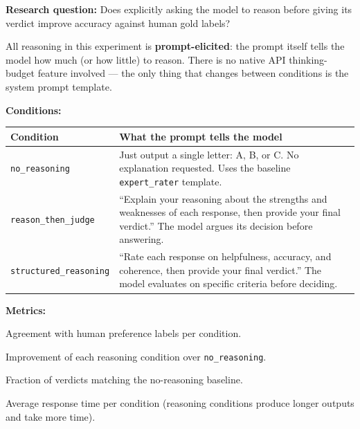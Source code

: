 \documentclass[11pt,a4paper]{article}
\begin{document}
\begin{experimentbox}
\textbf{Research question:} Does explicitly asking the model to reason before
giving its verdict improve accuracy against human gold labels?

\medskip
All reasoning in this experiment is \textbf{prompt-elicited}: the prompt
itself tells the model how much (or how little) to reason. There is no
native API thinking-budget feature involved --- the only thing that changes
between conditions is the system prompt template.

\medskip
\textbf{Conditions:}

\begin{center}
\small
\begin{tabular}{lp{8cm}}
  \toprule
  \textbf{Condition} & \textbf{What the prompt tells the model} \\
  \midrule
  \texttt{no\_reasoning} &
    Just output a single letter: A, B, or C. No explanation requested.
    Uses the baseline \texttt{expert\_rater} template. \\[4pt]
  \texttt{reason\_then\_judge} &
    ``Explain your reasoning about the strengths and weaknesses of each
    response, then provide your final verdict.'' The model argues its
    decision before answering. \\[4pt]
  \texttt{structured\_reasoning} &
    ``Rate each response on helpfulness, accuracy, and coherence, then
    provide your final verdict.'' The model evaluates on specific criteria
    before deciding. \\
  \bottomrule
\end{tabular}
\end{center}

\medskip
\textbf{Metrics:}
\begin{description}[nosep, leftmargin=1.2cm]
  \item[\texttt{accuracy\_vs\_gold}] Agreement with human preference labels
    per condition.
  \item[\texttt{delta\_accuracy}] Improvement of each reasoning condition
    over \texttt{no\_reasoning}.
  \item[\texttt{agreement\_vs\_no\_reasoning}] Fraction of verdicts matching
    the no-reasoning baseline.
  \item[\texttt{avg\_latency\_s}] Average response time per condition
    (reasoning conditions produce longer outputs and take more time).
\end{description}
\end{experimentbox}
\end{document}
